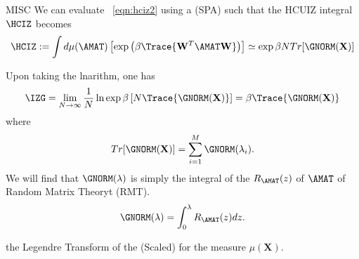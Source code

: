 MISC
We can evaluate \EQN~\ref{eqn:hciz2}
using a \SaddlePointApproximation (SPA) such that the HCUIZ integral $\HCIZ$ becomes
\begin{equation} 
  \label{eqn:hciz3}
\HCIZ := \int d\mu(\mathbf{\AMAT})\left[\exp\left(\beta\Trace{\mathbf{W}^{T}\mathbf{\AMAT}\mathbf{W}}\right)\right]
     \simeq\exp\beta N Tr[\GNORM(\mathbf{X})]
\end{equation}

Upon taking the lnarithm, one has
\begin{align}
\label{eqn:hciz4}
\IZG = \lim_{N\rightarrow \infty}\frac{1}{N} \ln\exp\beta\left[N \Trace{\GNORM(\mathbf{X})}\right] = \beta \Trace{\GNORM(\mathbf{X})}
\end{align}
where
\begin{equation}
\label{eqn:hciz-moment}
Tr[\GNORM(\mathbf{X})]= \sum_{i=1}^{M}\GNORM(\lambda_{i}) .
\end{equation}
%
We will find that $\GNORM(\lambda)$ is simply the integral of the \RTransform $R_{\AMAT}(z)$ of $\mathbf{\AMAT}$
of Random Matrix Theoryt (RMT).
%
\begin{equation}\label{eqn:rint}
    \GNORM(\lambda)=\int_{0}^{\lambda}R_{\AMAT}(z)dz.
\end{equation}
%


the Legendre Transform of the (Scaled) \CumulantGeneratingFunction for the measure $\mu(\mathbf{X})$.


